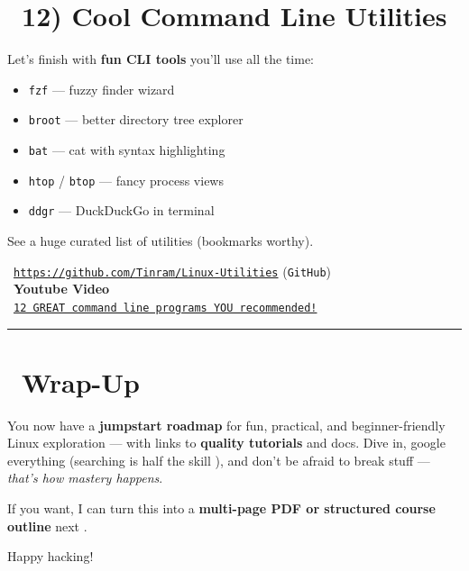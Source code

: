 \documentclass[12pt]{article}
\newcommand{\videoicon}{\faVideo}
\newcommand{\rocketicon}{\faRocket}
\begin{document}
\section*{\rocketicon\ 12) Cool Command Line Utilities}

Let's finish with \textbf{fun CLI tools} you'll use all the time:

\begin{itemize}
    \item \texttt{fzf} — fuzzy finder wizard
    \item \texttt{broot} — better directory tree explorer
    \item \texttt{bat} — cat with syntax highlighting
    \item \texttt{htop} / \texttt{btop} — fancy process views
    \item \texttt{ddgr} — DuckDuckGo in terminal
\end{itemize}

See a huge curated list of utilities (bookmarks worthy).
\begin{infobox}
\faArrowRight\ \href{https://github.com/Tinram/Linux-Utilities}{\texttt{https://github.com/Tinram/Linux-Utilities}} (\texttt{GitHub})\\
\videoicon\ \textbf{Youtube Video}\\
\faArrowRight\ \href{https://youtu.be/nCS4BtJ34-o?si=T6gagbT5k71H5BNE}{\texttt{12 GREAT command line programs YOU recommended!}}
\end{infobox}

\vspace{1em}
\begin{center}
\color{teamred}\rule{0.8\textwidth}{1pt}
\end{center}

\section*{\faLinux\ Wrap-Up}

You now have a \textbf{jumpstart roadmap} for fun, practical, and beginner-friendly Linux exploration — with links to \textbf{quality tutorials} and docs. Dive in, google everything (searching is half the skill \faSmile), and don't be afraid to break stuff — \textit{that's how mastery happens}.

If you want, I can turn this into a \textbf{multi-page PDF or structured course outline} next \rocketicon.

Happy hacking! \faBrain\faLaptopCode
\end{document}
